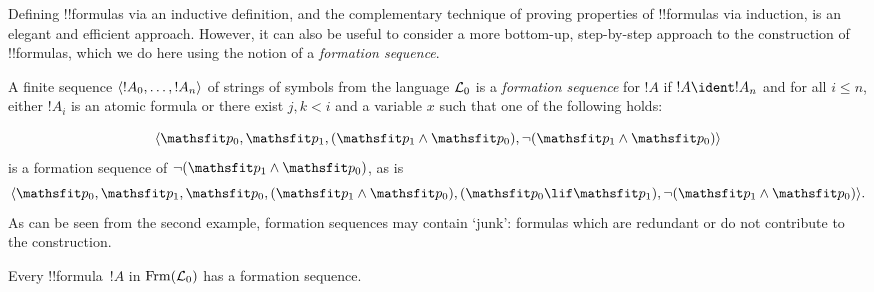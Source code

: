 \documentclass[../../../include/open-logic-section]{subfiles}
\begin{document}


Defining !!{formula}s via an inductive definition, and the
complementary technique of proving properties of !!{formula}s via
induction, is an elegant and efficient approach. However, it can
also be useful to consider a more bottom-up, step-by-step approach
to the construction of !!{formula}s, which we do here using the
notion of a \emph{formation sequence}.

\begin{defn}
A finite sequence $\langle !A_0,\dotsc,!A_n \rangle$ of strings of
symbols from the language $\Lang L_0$ is a \emph{formation
sequence} for $!A$ if $!A \ident !A_n$ and for all $i \leq n$,
either $!A_i$ is an atomic formula or there exist $j,k < i$ and
a variable $x$ such that one of the following holds:
\begin{enumerate}
\end{enumerate}
\end{defn}

\begin{ex}
\[
\tuple{
    \Obj p_0,
    \Obj p_1,
    (\Obj p_1 \land \Obj p_0),
    \lnot (\Obj p_1 \land \Obj p_0)
}
\]
is a formation sequence of
$\lnot (\Obj p_1 \land \Obj p_0)$, as is
\[
\tuple{
    \Obj p_0,
    \Obj p_1,
    \Obj p_0,
    (\Obj p_1 \land \Obj p_0),
    (\Obj p_0 \lif \Obj p_1),
    \lnot (\Obj p_1 \land \Obj p_0)
}.
\]
%
As can be seen from the second example, formation sequences
may contain `junk': formulas which are redundant or do not
contribute to the construction.
\end{ex}

\begin{prop}
Every !!{formula}~$!A$ in $\Frm[L_0]$ has a formation sequence.
\end{prop}
\end{document}
